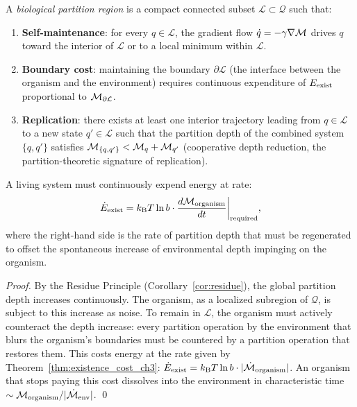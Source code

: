 \begin{definition}
\label{def:bio_partition_region}
A \emph{biological partition region} is a compact connected subset
$\mathcal{L} \subset \mathcal{Q}$ such that:
\begin{enumerate}[label=(\roman*)]
  \item \textbf{Self-maintenance}: for every $q \in \mathcal{L}$, the gradient
        flow $\dot{q} = -\gamma\nabla\mathcal{M}$ drives $q$ toward the interior
        of $\mathcal{L}$ or to a local minimum within $\mathcal{L}$.
  \item \textbf{Boundary cost}: maintaining the boundary $\partial\mathcal{L}$
        (the interface between the organism and the environment) requires
        continuous expenditure of $E_{\mathrm{exist}}$ proportional to $\mathcal{M}_{\partial\mathcal{L}}$.
  \item \textbf{Replication}: there exists at least one interior trajectory
        leading from $q \in \mathcal{L}$ to a new state $q' \in \mathcal{L}$
        such that the partition depth of the combined system $\{q, q'\}$
        satisfies $\mathcal{M}_{\{q,q'\}} < \mathcal{M}_q + \mathcal{M}_{q'}$ (cooperative
        depth reduction, the partition-theoretic signature of replication).
\end{enumerate}
\end{definition}

\begin{proposition}
\label{prop:life_eexist}
A living system must continuously expend energy at rate:
\begin{equation}
  \dot{E}_{\mathrm{exist}} = k_{\mathrm{B}} T \ln b \cdot \frac{d\mathcal{M}_{\mathrm{organism}}}{dt}\bigg|_{\mathrm{required}},
  \label{eq:life_power}
\end{equation}
where the right-hand side is the rate of partition depth that must be
regenerated to offset the spontaneous increase of environmental depth
impinging on the organism.
\end{proposition}

\begin{proof}
By the Residue Principle (Corollary~\ref{cor:residue}), the global partition
depth increases continuously. The organism, as a localized subregion of
$\mathcal{Q}$, is subject to this increase as noise. To remain in
$\mathcal{L}$, the organism must actively counteract the depth increase:
every partition operation by the environment that blurs the organism's
boundaries must be countered by a partition operation that restores them.
This costs energy at the rate given by Theorem~\ref{thm:existence_cost_ch3}:
$\dot{E}_{\mathrm{exist}} = k_{\mathrm{B}} T \ln b \cdot |\dot{\mathcal{M}}_{\mathrm{organism}}|$.
An organism that stops paying this cost dissolves into the environment in
characteristic time $\sim \mathcal{M}_{\mathrm{organism}} / |\dot{\mathcal{M}}_{\mathrm{env}}|$. \qed
\end{proof}

